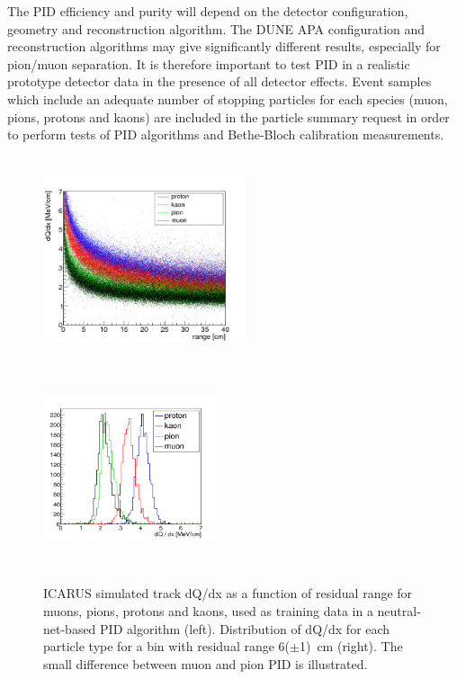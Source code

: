 The PID efficiency and purity will  depend on the detector configuration, geometry and 
reconstruction algorithm. The DUNE APA configuration and reconstruction algorithms
may give significantly different results, especially for pion/muon separation. 
It is therefore important to test PID in a realistic prototype detector
data in the presence of all detector effects.
Event samples which include an adequate number of stopping particles for each species
(muon, pions, protons and kaons) are included in the particle summary request in order to 
perform tests of PID algorithms and Bethe-Bloch calibration measurements.


\begin{figure}[h!]
  \centering
\includegraphics[width=0.53\textwidth,height=6.0cm]{figures/pids_new}
\includegraphics[width=0.46\textwidth,height=6.0cm]{figures/prkpimu_new}
  \caption{ICARUS simulated track dQ/dx as a function of residual range for muons, pions, protons and kaons, used as training data in a neutral-net-based PID algorithm (left). Distribution of dQ/dx for each particle type for a bin with residual range 
6($\pm$1)~cm (right). The small difference between muon and pion PID is illustrated.
}
\label{fig:resrange}
\end{figure}




